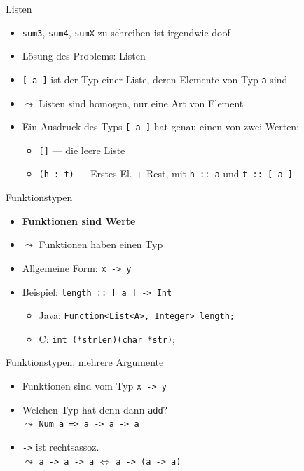 \documentclass{beamer}
\newcommand{\code}[1]{
	\begin{mdframed}
		
	\end{mdframed}
}
\begin{document}
\begin{frame}{Listen}
	\begin{itemize}
		\item \texttt{sum3}, \texttt{sum4}, \texttt{sumX} zu schreiben ist irgendwie doof
		\pause
		\item Lösung des Problems: Listen
		\item \texttt{[ a ]} ist der Typ einer Liste, deren Elemente von Typ \texttt{a} sind
		\item $\leadsto$ Listen sind homogen, nur eine Art von Element
	\end{itemize}

	\code{demos/Lists.hs}

	\begin{itemize}
		\item Ein Ausdruck des Typs \texttt{[ a ]} hat genau einen von zwei Werten:
		\begin{itemize}
			\item \texttt{[]} --- die leere Liste
			\item \texttt{(h : t)} --- Erstes El. + Rest, mit \texttt{h :: a} und \texttt{t :: [ a ]}
		\end{itemize}
	\end{itemize}
\end{frame}

\begin{frame}{Funktionstypen}
	\begin{itemize}
		\item \textbf{Funktionen sind Werte}
		\item $\leadsto$ Funktionen haben einen Typ
		\item Allgemeine Form: \texttt{x -> y}
		\item Beispiel: \texttt{length :: [ a ] -> Int}
		\begin{itemize}
			\item Java: \texttt{Function<List<A>, Integer> length;}
			\item C: \texttt{int (*strlen)(char *str)};
		\end{itemize}
	\end{itemize}
\end{frame}

\begin{frame}{Funktionstypen, mehrere Argumente}
	\code{demos/Maths.hs}

	\begin{itemize}
		\item Funktionen sind vom Typ \texttt{x -> y}
		\item Welchen Typ hat denn dann \texttt{add}? \\
		\pause
		$\leadsto$ \texttt{Num a => a -> a -> a}
		\item \texttt{->} ist rechtsassoz. \\
		$\leadsto$ \texttt{a -> a -> a} $\Leftrightarrow$ \texttt{a -> (a -> a)}
	\end{itemize}
\end{frame}
\end{document}
